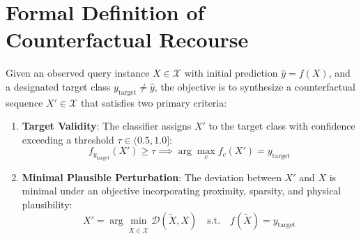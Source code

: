 \documentclass[11pt,a4paper]{report}
\begin{document}
\section{Formal Definition of Counterfactual Recourse}
Given an observed query instance $X \in \mathcal{X}$ with initial prediction $\hat{y} = f(X)$, and a designated target class $y_{\text{target}} \neq \hat{y}$, the objective is to synthesize a counterfactual sequence $X' \in \mathcal{X}$ that satisfies two primary criteria:
\begin{enumerate}
    \item \textbf{Target Validity}: The classifier assigns $X'$ to the target class with confidence exceeding a threshold $\tau \in (0.5, 1.0]$:
    \begin{equation}
        f_{y_{\text{target}}}(X') \ge \tau \implies \arg\max_{c} f_c(X') = y_{\text{target}}
    \end{equation}
    \item \textbf{Minimal Plausible Perturbation}: The deviation between $X'$ and $X$ is minimal under an objective incorporating proximity, sparsity, and physical plausibility:
    \begin{equation}
        X' = \arg\min_{\tilde{X} \in \mathcal{X}} \mathcal{D}(\tilde{X}, X) \quad \text{s.t.} \quad f(\tilde{X}) = y_{\text{target}}
    \end{equation}
\end{enumerate}
\end{document}
